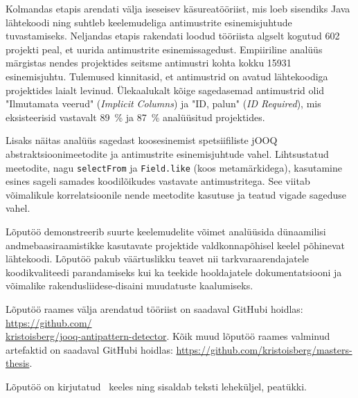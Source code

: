 Kolmandas etapis arendati välja iseseisev käsureatööriist, mis loeb sisendiks Java lähtekoodi ning suhtleb keelemudeliga antimustrite esinemisjuhtude tuvastamiseks. Neljandas etapis rakendati loodud tööriista algselt kogutud \num{602} projekti peal, et uurida antimustrite esinemissagedust. Empiiriline analüüs märgistas nendes projektides seitsme antimustri kohta kokku \num{15931} esinemisjuhtu. Tulemused kinnitasid, et antimustrid on avatud lähtekoodiga projektides laialt levinud. Ülekaalukalt kõige sagedasemad antimustrid olid "Ilmutamata veerud" (\textit{Implicit Columns}) ja "ID, palun" (\textit{ID Required}), mis eksisteerisid vastavalt \qty{89}{\percent} ja \qty{87}{\percent} analüüsitud projektides.

Lisaks näitas analüüs sagedast koosesinemist spetsiifiliste jOOQ abstraktsioonimeetodite ja antimustrite esinemisjuhtude vahel. Lihtsustatud meetodite, nagu \texttt{selectFrom} ja \texttt{Field.like} (koos metamärkidega), kasutamine esines sageli samades koodilõikudes vastavate antimustritega. See viitab võimalikule korrelatsioonile nende meetodite kasutuse ja teatud vigade sageduse vahel.

Lõputöö demonstreerib suurte keelemudelite võimet analüüsida dünaamilisi andmebaasiraamistikke kasutavate projektide valdkonnapõhisel keelel põhinevat lähtekoodi. Lõputöö pakub väärtuslikku teavet nii tarkvaraarendajatele koodikvaliteedi parandamiseks kui ka teekide hooldajatele dokumentatsiooni ja võimalike rakendusliidese-disaini muudatuste kaalumiseks.

Lõputöö raames välja arendatud tööriist on saadaval GitHubi hoidlas: \href{https://github.com/kristoisberg/jooq-antipattern-detector}{https://github.com/\\kristoisberg/jooq-antipattern-detector}. Kõik muud lõputöö raames valminud artefaktid on saadaval GitHubi hoidlas: \href{https://github.com/kristoisberg/masters-thesis}{https://github.com/kristoisberg/masters-thesis}.

Lõputöö on kirjutatud \langEst~keeles ning sisaldab teksti \calculatepages leheküljel, 
 peatükki.
